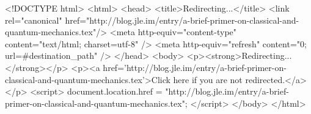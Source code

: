 <!DOCTYPE html>
<html>
<head>
<title>Redirecting...</title>
<link rel="canonical" href="http://blog.jle.im/entry/a-brief-primer-on-classical-and-quantum-mechanics.tex"/>
<meta http-equiv="content-type" content="text/html; charset=utf-8" />
<meta http-equiv="refresh" content="0; url=#{destination_path}" />
</head>
<body>
  <p><strong>Redirecting...</strong></p>
  <p><a href='http://blog.jle.im/entry/a-brief-primer-on-classical-and-quantum-mechanics.tex'>Click here if you are not redirected.</a></p>
  <script>
    document.location.href = "http://blog.jle.im/entry/a-brief-primer-on-classical-and-quantum-mechanics.tex";
  </script>
</body>
</html>
